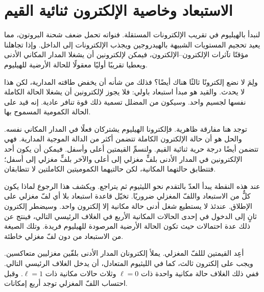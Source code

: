 \section{الاستبعاد وخاصية الإلكترون ثنائية القيم}

لنبدأ بالهيليوم في تقريب الإلكترونات المستقلة. فنواته تحمل ضعف شحنة البروتون، مما يعيد تحجيم المستويات الشبيهة بالهيدروجين ويجذب الإلكترونات إلى الداخل. وإذا تجاهلنا مؤقتًا تآثرات الإلكترون--الإلكترون، فيمكن لإلكترونين أن يشغلا المدار المكاني الأدنى ويعطيا تقريبًا أوليًا معقولًا للحالة الأرضية للهيليوم.

ولِمَ لا نضع إلكترونًا ثالثًا هناك أيضًا؟ فذلك من شأنه أن يخفض طاقته المدارية، لكن هذا لا يحدث. والقيد هو مبدأ استبعاد باولي: فلا يجوز لإلكترونين أن يشغلا الحالة الكاملة نفسها لجسيم واحد. وسيكون من المضلل تسمية ذلك قوة تنافر عادية. إنه قيد على الحالة الكمومية المسموح بها.

توجد هنا مفارقة ظاهرية. فإلكترونا الهيليوم يشتركان فعلًا في المدار المكاني نفسه. والحل هو أن حالة الإلكترون الكاملة تتضمن أكثر من الدالة الموجية المدارية. فهي تتضمن أيضًا درجة حرية ثنائية القيم. ولنسمِّ القيمتين أعلى وأسفل. فيمكن أن يكون أحد الإلكترونين في المدار الأدنى بلفٍّ مغزلي إلى أعلى والآخر بلفٍّ مغزلي إلى أسفل؛ فتتطابق حالتهما المكانية، لكن حالتيهما الكموميتين الكاملتين لا تتطابقان.

عند هذه النقطة يبدأ العدّ بالتقدم نحو الليثيوم ثم يتراجع. ويكشف هذا الرجوع لماذا يكون كلٌّ من الاستبعاد واللفّ المغزلي ضروريًا. تخيّل قاعدة استبعاد بلا أي لفّ مغزلي على الإطلاق. عندئذ لا يستطيع شغل أدنى حالة مكانية إلا إلكترون واحد. وسيضطر إلكترون ثانٍ إلى الدخول في إحدى الحالات المكانية الأربع في الغلاف الرئيسي التالي، فينتج عن ذلك عدة احتمالات حيث تكون الحالة الأرضية المرصودة للهيليوم فريدة. وتلك الصيغة من الاستبعاد من دون لفّ مغزلي خاطئة.

أعِد القيمتين لللفّ المغزلي. يملأ إلكترونان المدار الأدنى بلفّين مغزليين متعاكسين. ويجب على إلكترون ثالث، كما في الليثيوم المتعادل، أن يدخل الغلاف الرئيسي التالي. ففي ذلك الغلاف حالة مكانية واحدة ذات \(\ell=0\) وثلاث حالات مكانية ذات \(\ell=1\). وقبل احتساب اللفّ المغزلي توجد أربع إمكانات.

\begin{classroomqa}
\end{classroomqa}


